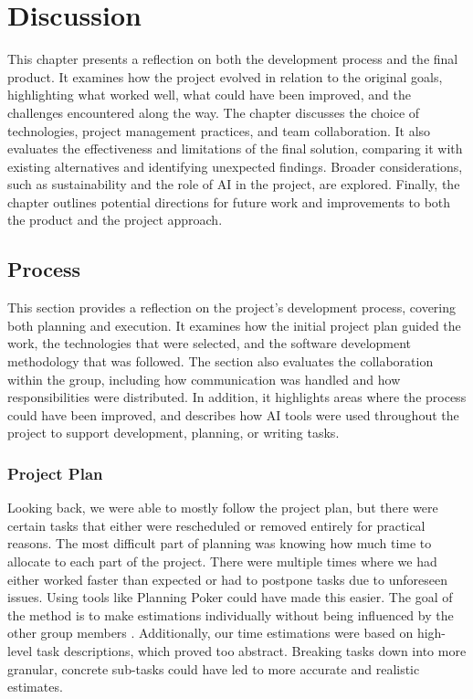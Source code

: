 \chapter{Discussion}\label{chap:discussion}

This chapter presents a reflection on both the development process and the final product. It examines how the project evolved in relation to the original goals, highlighting what worked well, what could have been improved, and the challenges encountered along the way. The chapter discusses the choice of technologies, project management practices, and team collaboration. It also evaluates the effectiveness and limitations of the final solution, comparing it with existing alternatives and identifying unexpected findings. Broader considerations, such as sustainability and the role of AI in the project, are explored. Finally, the chapter outlines potential directions for future work and improvements to both the product and the project approach.

\section{Process}\label{sec:discussion:process}

This section provides a reflection on the project's development process, covering both planning and execution. It examines how the initial project plan guided the work, the technologies that were selected, and the software development methodology that was followed. The section also evaluates the collaboration within the group, including how communication was handled and how responsibilities were distributed. In addition, it highlights areas where the process could have been improved, and describes how AI tools were used throughout the project to support development, planning, or writing tasks.

\subsection{Project Plan}\label{subsec:discussion:process:projectplan}

Looking back, we were able to mostly follow the project plan, but there were certain tasks that either were rescheduled or removed entirely for practical reasons. The most difficult part of planning was knowing how much time to allocate to each part of the project. There were multiple times where we had either worked faster than expected or had to postpone tasks due to unforeseen issues. Using tools like Planning Poker could have made this easier. The goal of the method is to make estimations individually without being influenced by the other group members \cite{planningpokerwiki}. Additionally, our time estimations were based on high-level task descriptions, which proved too abstract. Breaking tasks down into more granular, concrete sub-tasks could have led to more accurate and realistic estimates.

